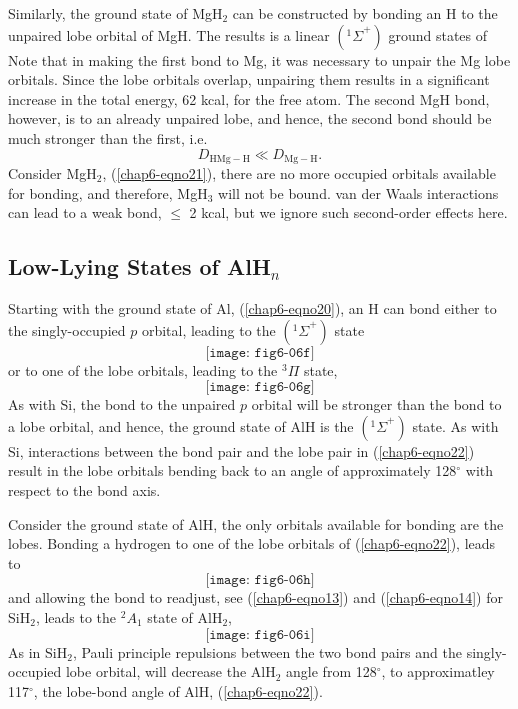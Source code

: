 Similarly, the ground state of MgH$_2$ can be constructed by bonding 
an H to the unpaired lobe orbital of MgH.  The results is a linear
$({^1\Sigma}^+)$ ground states of
\begin{equation}
\label{chap6-eqno21}
\end{equation}
Note that in making the first bond to Mg, it was necessary to unpair 
the Mg lobe orbitals.  Since the lobe orbitals overlap, unpairing them 
results in a significant increase in the total energy, 62 kcal, for 
the free atom.  The second MgH bond, however, is to an already 
unpaired lobe, and hence, the second bond should be much stronger 
than the first, i.e.
\begin{equation}
D_\mathrm{HMg-H} \ll D_\mathrm{Mg-H} .
\end{equation}
Consider MgH$_2$, (\ref{chap6-eqno21}), there are no more occupied
orbitals available for bonding, and therefore, MgH$_3$ will not be
bound.  van der Waals interactions can lead to a weak bond, $\leq$ 2
kcal, but we ignore such second-order effects here.

\subsection{Low-Lying States of AlH$_n$}

Starting with the ground state of Al, (\ref{chap6-eqno20}), an H can
bond either to the singly-occupied $p$ orbital, leading to the
$({^1\Sigma}^+)$ state
\begin{equation}
\texttt{[image: fig6-06f]}
\label{chap6-eqno22}
\end{equation}
or to one of the lobe orbitals, leading to the ${^3\Pi}$ state,
\begin{equation}
\texttt{[image: fig6-06g]}
\label{chap6-eqno22-2}
\end{equation}
As with Si, the bond to the unpaired $p$ orbital will be stronger than
the bond to a lobe orbital, and hence, the ground state of AlH is the
$({^1\Sigma}^+)$ state.  As with Si, interactions between the bond
pair and the lobe pair in (\ref{chap6-eqno22}) result in the lobe
orbitals bending back to an angle of approximately 128$^{\circ}$ with
respect to the bond axis.

Consider the ground state of AlH, the only orbitals available for
bonding are the lobes.  Bonding a hydrogen to one of the lobe orbitals
of (\ref{chap6-eqno22}), leads to
\begin{equation}
\texttt{[image: fig6-06h]}
\label{chap6-eqno23}
\end{equation}
and allowing the bond to readjust, see (\ref{chap6-eqno13}) and
(\ref{chap6-eqno14}) for SiH$_2$, leads to the ${^2A}_1$ state of
AlH$_2$,
\begin{equation}
\texttt{[image: fig6-06i]}
\end{equation}
As in SiH$_2$, Pauli principle repulsions between the two bond pairs 
and the singly-occupied lobe orbital, will decrease the AlH$_2$ angle 
from 128$^{\circ}$, to approximatley 117$^{\circ}$, the lobe-bond 
angle of AlH, (\ref{chap6-eqno22}).

